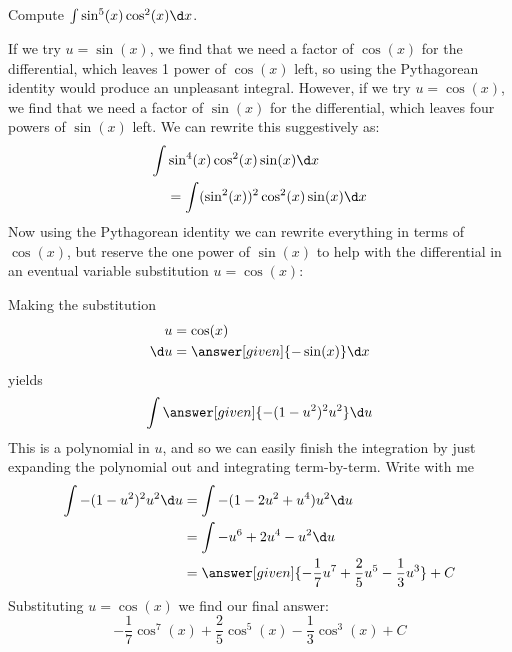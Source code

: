\documentclass{ximera}
\begin{document}
\begin{example}
  Compute $\int \sin^{5}(x) \cos^2(x) \d x$.

  \begin{explanation}
   
    If we try $u=\sin(x)$, we find that we need a factor of $\cos(x)$ for the differential, which leaves 1 power of $\cos(x)$ left, so using the Pythagorean identity would produce an unpleasant integral.  However, if we try $u=\cos(x)$, we find that we need a factor of $\sin(x)$ for the differential, which leaves four powers of $\sin(x)$ left.    We can rewrite this suggestively as:
    \begin{align*}
    \int &\sin^4(x) \cos^2(x) \sin(x) \d x \\
    &= \int (\sin^2(x))^2 \cos^2(x) \sin(x) \d x
    \end{align*}
    Now using the Pythagorean identity we can rewrite everything in
    terms of $\cos(x)$, but reserve the one power of $\sin(x)$ to help
    with the differential in an eventual variable substitution $u=\cos(x)$:
    \begin{center}%
    \end{center}
    Making the substitution
    \begin{align*}
      u &= \cos(x)\\
      \d u &=\answer[given]{-\sin(x)} \d x
    \end{align*}
    yields
    \[
    \int \answer[given]{-(1-u^2)^2 u^2} \d u
    \]
    This is a polynomial in $u$, and so we can easily finish the
    integration by just expanding the polynomial out and integrating
    term-by-term. Write with me
    \begin{align*}
      \int {-(1-u^2)^2 u^2} \d u &= \int -(1-2u^2+u^4)u^2\d u\\
      &= \int-u^6 + 2u^4-u^2 \d u\\
      &=\answer[given]{-\frac{1}{7}u^7 + \frac{2}{5}u^5 -\frac{1}{3} u^3}+C
    \end{align*}
    Substituting $u = \cos(x)$ we find our final answer:
    \[
    -\frac{1}{7}\cos^7(x) + \frac{2}{5}\cos^5(x) - \frac{1}{3} \cos^3(x)+C
    \]
  \end{explanation}
\end{example}
\end{document}
